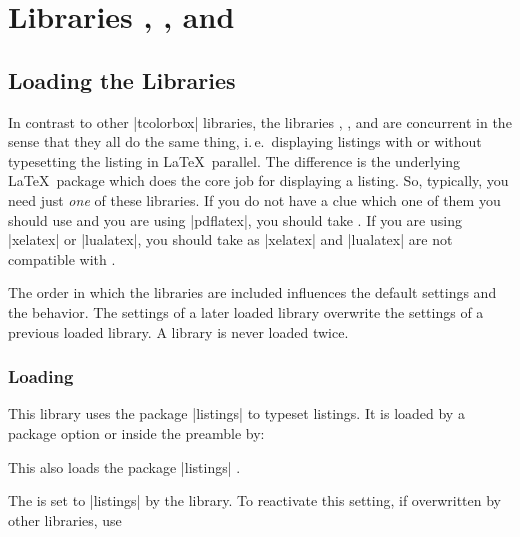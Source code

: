 \clearpage
\section{Libraries
  ,
  , and
  }\label{sec:listings}%
%

\subsection{Loading the Libraries}
In contrast to other |tcolorbox| libraries, the libraries
, , and  are concurrent in the sense that
they all do the same thing, i.\,e.\ displaying listings with or without typesetting
the listing in \LaTeX\ parallel.
The difference is the underlying \LaTeX\ package which does the core job for
displaying a listing. So, typically, you need just \emph{one} of these
libraries. If you do not have a clue which one of them you should use
and you are using |pdflatex|, you should take .
If you are using |xelatex| or |lualatex|, you should take 
as |xelatex| and |lualatex| are not compatible with .

\begin{marker}
The order in which the libraries are included influences the default settings and
the  behavior. The settings of a later loaded library overwrite
the settings of a previous loaded library. A library is never loaded twice.
\end{marker}


\subsubsection{Loading }
This library uses the package |listings| \cite{hoffmann:listings} to typeset
listings. It is loaded by a package option or inside the preamble by:
\begin{dispListing}
\end{dispListing}
This also loads the package |listings| \cite{hoffmann:listings}.

The  is set to |listings| by the library.
To reactivate this setting, if overwritten by other libraries, use
\begin{dispListing}
\end{dispListing}

